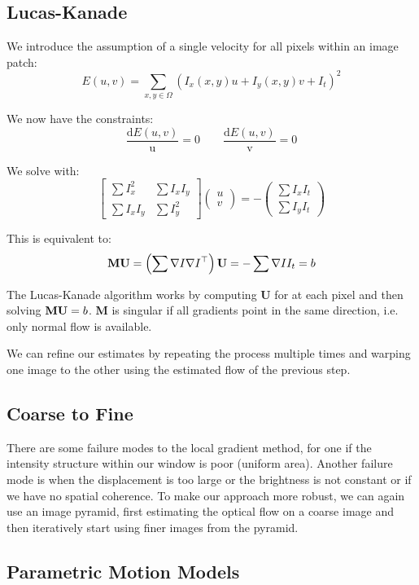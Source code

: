 \subsection{Lucas-Kanade}

We introduce the assumption of a single velocity for all pixels within an image patch:
$$E(u, v) = \sum_{x, y \in \Omega} \left( I_x(x, y)u + I_y(x, y)v + I_t \right)^2$$

We now have the constraints:
$$\frac{\mathrm d E(u, v)}{\mathrm u} = 0 \qquad \frac{\mathrm d E(u, v)}{\mathrm v} = 0$$

We solve with:
$$
\begin{bmatrix}
	\sum I_x^2 & \sum I_x I_y \\
	\sum I_x I_y & \sum I_y^2
\end{bmatrix}
\begin{pmatrix}
	u \\
	v
\end{pmatrix}
= -
\begin{pmatrix}
	\sum I_x I_t \\
	\sum I_y I_t
\end{pmatrix}
$$

This is equivalent to:
$$\textbf M \textbf U = \left( \sum \nabla I \nabla I^\top \right) \textbf U = - \sum \nabla I I_t = b$$

The Lucas-Kanade algorithm works by computing \textbf U for at each pixel and then solving $\textbf M \textbf U = b$. \textbf M is singular if all gradients point in the same direction, i.e. only normal flow is available. \medskip

We can refine our estimates by repeating the process multiple times and warping one image to the other using the estimated flow of the previous step.


\subsection{Coarse to Fine}

There are some failure modes to the local gradient method, for one if the intensity structure within our window is poor (uniform area). Another failure mode is when the displacement is too large or the brightness is not constant or if we have no spatial coherence. To make our approach more robust, we can again use an image pyramid, first estimating the optical flow on a coarse image and then iteratively start using finer images from the pyramid.


\subsection{Parametric Motion Models}


